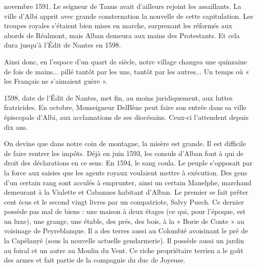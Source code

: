 

novembre 1591. Le seigneur de Tanus avait d'ailleurs rejoint les assaillants. La ville d'Albi apprit avec grande consternation la nouvelle de cette capitulation. Les troupes royales s'étaient bien mises en marche, surprenant les réformés aux abords de Réalmont, mais Alban demeura aux mains des Protestants. Et cela dura jusqu'à l'Édit de Nantes en 1598.

Ainsi donc, en l'espace d'un quart de siècle, notre village changea une quinzaine de fois de mains... pillé tantôt par les uns, tantôt par les autres... Un temps où « les Français ne s'aimaient guère ».

1598, date de l'Édit de Nantes, met fin, au moins juridiquement, aux luttes fratricides. En octobre, Monseigneur DelBène peut faire son entrée dans sa ville épiscopale d'Albi, aux acclamations de ses diocésains. Ceux-ci l'attendent depuis dix ans.

On devine que dans notre coin de montagne, la misère est grande. Il est difficile de faire rentrer les impôts. Déjà en juin 1593, les consuls d'Alban font à qui de droit des déclarations en ce sens. En 1594, le sang coula. Le peuple s'opposait par la force aux saisies que les agents royaux voulaient mettre à exécution. Des gens d'un certain rang sont acculés à emprunter, ainsi un certain Manelphe, marchand demeurant à la Vialette et Cabannes habitant d'Alban. Le premier se fait prêter cent écus et le second vingt livres par un compatriote, Salvy Puech. Ce dernier possède pas mal de biens : une maison à deux étages (ce qui, pour l'époque, est un luxe), une grange, une étable, des prés, des bois, à la « Borie de Conte » au voisinage de Peyreblanque. Il a des terres aussi au Colombié avoisinant le pré de la Capélanyé (sous la nouvelle actuelle gendarmerie). Il possède aussi un jardin au foiral et un autre au Moulin du Vent. Ce riche propriétaire terrien a le goût des armes et fait partie de la compagnie du duc de Joyeuse.
